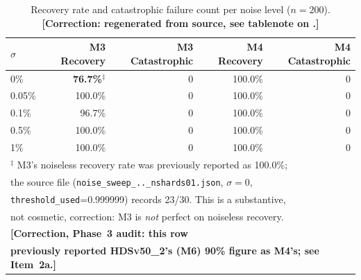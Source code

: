 \documentclass[twoside,11pt]{article}
\newcommand{\HDS}{\textsc{HDSv50\_2}}
\begin{document}
\begin{table}[H]
\centering
\caption{Recovery rate and catastrophic failure count per noise level ($n=200$).
\textbf{[Correction: regenerated from source, see tablenote on .]}}
\label{tab:rr_noise}
\small
\begin{tabular}{lrrrr}
\toprule
$\sigma$ & M3 Recovery & M3 Catastrophic & M4 Recovery & M4 Catastrophic\\
\midrule
0\%    & \textbf{76.7\%$^\ddagger$} & 0 & 100.0\% & 0\\
0.05\% & 100.0\%          & 0 & 100.0\% & 0\\
0.1\%  & 96.7\%           & 0 & 100.0\% & 0\\
0.5\%  & 100.0\%          & 0 & 100.0\% & 0\\
1\%    & 100.0\%          & 0 & 100.0\% & 0\\
\bottomrule
\multicolumn{5}{l}{\footnotesize$^\ddagger$ M3's noiseless recovery rate was previously reported as 100.0\%;}\\
\multicolumn{5}{l}{\footnotesize the source file (\texttt{noise\_sweep\_..\_nshards01.json}, $\sigma=0$,}\\
\multicolumn{5}{l}{\footnotesize \texttt{threshold\_used}=0.999999) records 23/30. This is a substantive,}\\
\multicolumn{5}{l}{\footnotesize not cosmetic, correction: M3 is \emph{not} perfect on noiseless recovery.}\\
\multicolumn{5}{l}{\footnotesize\textbf{[Correction, Phase~3 audit: this row}}\\
\multicolumn{5}{l}{\footnotesize\textbf{previously reported \HDS's (M6) 90\% figure as M4's; see Item~2a.]}}\\
\end{tabular}
\end{table}
\end{document}
